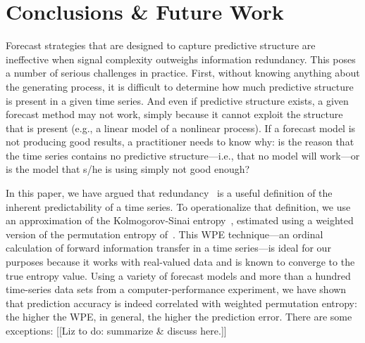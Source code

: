 \section{ Conclusions \& Future Work }\label{sec:conc}

Forecast strategies that are designed to capture predictive structure
are ineffective when signal complexity outweighs information
redundancy.  This poses a number of serious challenges in practice.
First, without knowing anything about the generating process, it is
difficult to determine how much predictive structure is present in a
given time series.  And even if predictive structure exists, a given
forecast method may not work, simply because it cannot exploit the
structure that is present (e.g., a linear model of a nonlinear
process).  If a forecast model is not producing good results, a
practitioner needs to know why: is the reason that the time series
contains no predictive structure---i.e., that no model will work---or
is the model that s/he is using simply not good enough?

In this paper, we have argued that redundancy~\cite{crutchfield2003}
is a useful definition of the inherent predictability of a time
series.  To operationalize that definition, we use an approximation of
the Kolmogorov-Sinai entropy~\cite{lind95}, estimated using a weighted
version of the permutation entropy of~\cite{bandt2002per}.  This WPE
technique---an ordinal calculation of forward information transfer in
a time series---is ideal for our purposes because it works with
real-valued data and is known to converge to the true entropy value.
Using a variety of forecast models and more than a hundred time-series
data sets from a computer-performance experiment, we have shown that
prediction accuracy is indeed correlated with weighted permutation
entropy: the higher the WPE, in general, the higher the prediction
error.  There are some exceptions: [[Liz to do: summarize \& discuss
    here.]]


